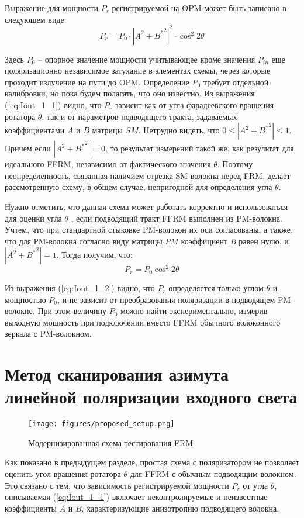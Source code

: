 \documentclass{article}
\begin{document}
Выражение для мощности $P_r$ регистрируемой на OPM может быть записано в следующем виде:
\begin{equation}
	\label{eq:Iout_1_1}
	P_{r} = P_0 \cdot \left| A^2 + {B^*}^2 \right|^2 \cdot \cos^2 2 \theta
\end{equation}

Здесь $P_0$ – опорное значение мощности учитывающее кроме значения $P_{in}$ еще поляризационно независимое затухание в элементах схемы, через которые проходит излучение на пути до OPM.
Определение $P_0$ требует отдельной калибровки, но пока будем полагать, что оно известно.
Из выражения (\ref{eq:Iout_1_1}) видно, что $P_{r}$ зависит как от угла фарадеевского вращения ротатора $\theta$, так и от параметров подводящего тракта, задаваемых коэффициентами $A$ и $B$ матрицы $SM$.
Нетрудно видеть, что  $0\le\left| A^2 + {B^*}^2 \right|\le1$.
Причем если $\left| A^2 + {B^*}^2 \right|=0$, то результат измерений такой же, как результат для идеального FFRM, независимо от фактического значения  $\theta$.
Поэтому неопределенность, связанная наличием отрезка SM-волокна перед FRM, делает рассмотренную схему, в общем случае, непригодной для определения угла $\theta$.

Нужно отметить, что данная схема может работать корректно и использоваться для оценки  угла $\theta$ , если подводящий тракт FFRM выполнен из PM-волокна.
Учтем, что при стандартной стыковке PM-волокон их оси согласованы, а также, что для РM-волокна согласно виду матрицы $PM$ коэффициент \textit{B} равен нулю, и $\left| A^2 + {B^*}^2 \right| = 1$.
Тогда получим, что: 
\begin{equation}
	\label{eq:Iout_1_2}
	P_{r} =  P_0 \cos^2 2 \theta 
\end{equation}

Из выражения (\ref{eq:Iout_1_2}) видно, что $P_{r}$ определяется только углом  $\theta$ и мощностью $P_0$, и не зависит от преобразования поляризации в подводящем PM-волокне.
При этом величину $P_0$ можно найти экспериментально, измерив выходную мощность при подключении вместо FFRM обычного волоконного зеркала с PM-волокном.


\section{Метод сканирования азимута линейной поляризации входного света}
\begin{figure}[b]
	\centering
	\texttt{[image: figures/proposed\_setup.png]}
	\caption{Модернизированная схема тестирования FRM}
	\label{fig:proposed_setup}
\end{figure} 
Как показано в предыдущем разделе, простая схема с поляризатором не позволяет оценить угол вращения ротатора $\theta$ для FFRM с обычным подводящим волокном. 
Это связано с тем, что зависимость регистрируемой мощности $P_r$ от угла $\theta$, описываемая (\ref{eq:Iout_1_1}) включает неконтролируемые и неизвестные коэффициенты $A$ и $B$, характеризующие анизотропию подводящего волокна.
\end{document}
